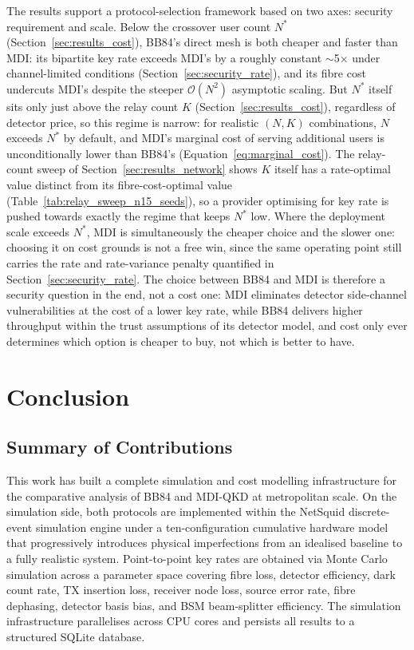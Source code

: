 \documentclass[12pt]{article}
\let\oldsection\section
\renewcommand{\section}{\clearpage\oldsection}
\begin{document}
The results support a protocol-selection framework based on two axes: security requirement and scale. Below the crossover user count $N^*$ (Section~\ref{sec:results_cost}), BB84's direct mesh is both cheaper and faster than MDI: its bipartite key rate exceeds MDI's by a roughly constant $\sim$5$\times$ under channel-limited conditions (Section~\ref{sec:security_rate}), and its fibre cost undercuts MDI's despite the steeper $\mathcal{O}(N^2)$ asymptotic scaling. But $N^*$ itself sits only just above the relay count $K$ (Section~\ref{sec:results_cost}), regardless of detector price, so this regime is narrow: for realistic $(N,K)$ combinations, $N$ exceeds $N^*$ by default, and MDI's marginal cost of serving additional users is unconditionally lower than BB84's (Equation~\ref{eq:marginal_cost}). The relay-count sweep of Section~\ref{sec:results_network} shows $K$ itself has a rate-optimal value distinct from its fibre-cost-optimal value (Table~\ref{tab:relay_sweep_n15_seeds}), so a provider optimising for key rate is pushed towards exactly the regime that keeps $N^*$ low. Where the deployment scale exceeds $N^*$, MDI is simultaneously the cheaper choice and the slower one: choosing it on cost grounds is not a free win, since the same operating point still carries the rate and rate-variance penalty quantified in Section~\ref{sec:security_rate}. The choice between BB84 and MDI is therefore a security question in the end, not a cost one: MDI eliminates detector side-channel vulnerabilities at the cost of a lower key rate, while BB84 delivers higher throughput within the trust assumptions of its detector model, and cost only ever determines which option is cheaper to buy, not which is better to have.

\section{Conclusion}
\label{sec:conclusion}

\subsection{Summary of Contributions}

This work has built a complete simulation and cost modelling infrastructure for the comparative analysis of BB84 and MDI-QKD at metropolitan scale. On the simulation side, both protocols are implemented within the NetSquid discrete-event simulation engine under a ten-configuration cumulative hardware model that progressively introduces physical imperfections from an idealised baseline to a fully realistic system. Point-to-point key rates are obtained via Monte Carlo simulation across a parameter space covering fibre loss, detector efficiency, dark count rate, TX insertion loss, receiver node loss, source error rate, fibre dephasing, detector basis bias, and BSM beam-splitter efficiency. The simulation infrastructure parallelises across CPU cores and persists all results to a structured SQLite database.
\end{document}
